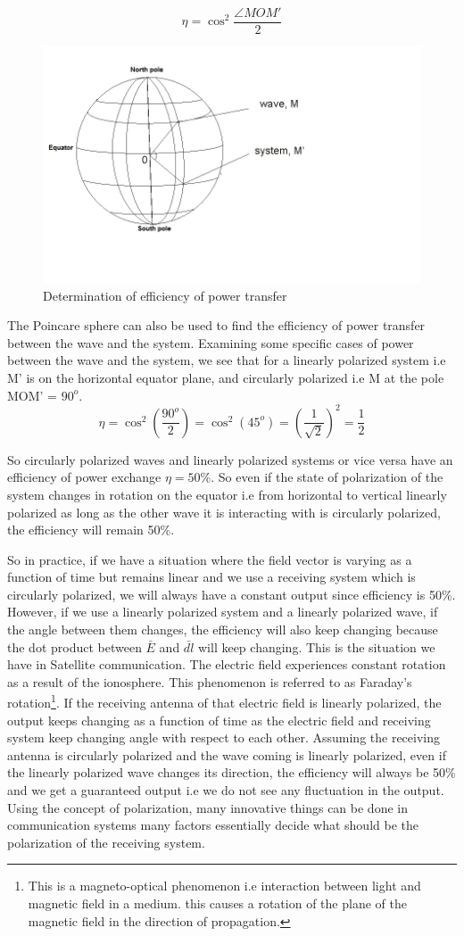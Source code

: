 \[\eta = \cos^2 {\frac{ \angle  MOM' }{2}}  \]
\begin{figure}
\centering
\includegraphics[width=0.7\linewidth]{./graphics/power}
\caption{Determination of efficiency of power transfer}
\label{fig:power}
\end{figure}

The Poincare sphere can also be used to find the efficiency of power transfer between the wave and the system. Examining some specific cases of power between the wave and the system, we see that for a linearly polarized system i.e M' is on the horizontal equator plane, and circularly polarized i.e M at the pole MOM' = $ 90^o $.
\[ \eta= \cos ^2(\frac{90^o}{2}) =\cos ^2(45^o) =(\frac{1}{\sqrt{2}})^2  = \frac{1}{2}\]

So circularly polarized waves and linearly polarized systems or vice versa have an efficiency of power exchange $ \eta=  50\% $. So even if the state of polarization of the system changes in rotation on the equator i.e from horizontal to vertical linearly polarized as long as the other wave it is interacting with is circularly polarized, the efficiency will remain 50\%.

So in practice, if we have a situation where the field vector is varying as a function of time but remains linear and we use a receiving system which is circularly polarized, we will always have a constant output since efficiency is 50\%. However, if we use a linearly polarized system and a linearly polarized wave, if the angle between them changes, the efficiency will also keep changing because the dot product between $ \bar {E} $ and $ \bar{dl} $ will keep changing. This is the situation we have in Satellite communication. The electric field experiences constant rotation as a result of the ionosphere. This phenomenon is referred to as Faraday's rotation\footnote{This is a magneto-optical phenomenon i.e interaction between light and magnetic field in a medium. this causes a rotation of the plane of the magnetic field in the direction of propagation.}. If the receiving antenna of that electric field is linearly polarized, the output keeps changing as a function of time as the electric field and receiving system keep changing angle with respect to each other. Assuming the receiving antenna is circularly polarized and the wave coming is linearly polarized, even if the linearly polarized wave changes its direction, the efficiency will always be 50\% and we get a guaranteed output i.e we do not see any fluctuation in the output. Using the concept of polarization, many innovative things can be done in communication systems many factors essentially decide what should be the polarization of the receiving system.

